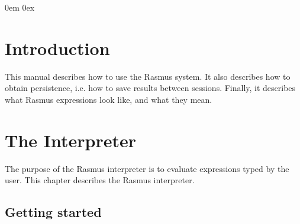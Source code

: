 \documentclass[a4,14pt,latin1]{article}
\begin{document}
               

\parindent 0em
\parskip \baselineskip %
\itemsep 0ex
\newcommand{\sectionref}[1]{section~\ref{#1}}
\newcommand{\chapterref}[1]{chapter~\ref{#1}}
\newcommand{\Chapterref}[1]{Chapter~\ref{#1}}
\newcommand{\figureref}[1]{figure~\ref{#1}}
\newcommand{\RASMUS}{{\sc Xrasmus}}
\newcommand{\UCRASMUS}{{\tt xrasmus}}
\newcommand{\MODIFY}{{\sc Xmodify}}
\newcommand{\X}{{\sc X}}
\newcommand{\UNIX}{{\sc UNIX}}
\newcommand{\FIX}[1]{$\langle\langle$#1$\rangle\rangle$}
\newcommand{\SET}[1]{\{#1\}}
\newcommand{\NT}[1]{$\langle$#1$\rangle$}
\newcommand{\BUTTON}[1]{\fbox{\tt #1}}
\newcommand{\FBUTTON}[1]{\framebox[2em]{\rule[-.5ex]{0em}{2.5ex}{\tt #1}}}
\newcommand{\META}[1]{{\rm\bf #1}\index{syntaks!#1}}
\newcommand{\METAPLUS}[1]{{\rm\bf #1}$^{\displaystyle +}$\index{syntaks!#1}}
\newcommand{\METASTAR}[1]{{\rm\bf #1}$^{\displaystyle \,*}$\index{syntaks!#1}}
\newcommand{\METAPLUSLIST}[1]{{\rm\bf #1}$^{\displaystyle
                                            \,+\lambda}$\index{syntaks!#1}}
\newcommand{\METASTARLIST}[1]{{\rm\bf #1}$^{\displaystyle
                                            \,*\lambda}$\index{syntaks!#1}}
\newcommand{\METAOPT}[1]{{\rm\bf #1}$^{\displaystyle
                                            \,\circ}$\index{syntaks!#1}}
\newcommand{\IS}{$::=\;\;\;$}
\newcommand{\OR}{$\;\;\mid\;\;$}
%
\newcommand{\define}[1]{{\it #1\/}}
\newcommand{\RAS}{{\sc Rasmus}}
\newcommand{\EMACS}{{\sc Emacs}}
\newcommand{\menu}[1]{\fbox{\fbox{\tt #1}}}
\newcommand{\mopt}[1]{\fbox{\tt #1}}
%
\tableofcontents
\newpage
{}
%
\section{Introduction}

This manual describes how to use the Rasmus system. It also describes
how to obtain persistence, i.e. how to save results between
sessions. Finally, it describes what Rasmus expressions look like, and
what they mean.

\section{The Interpreter}

The purpose of the Rasmus interpreter is to evaluate expressions typed
by the user. This chapter describes the \RAS{} interpreter.

\subsection{Getting started}
\end{document}

